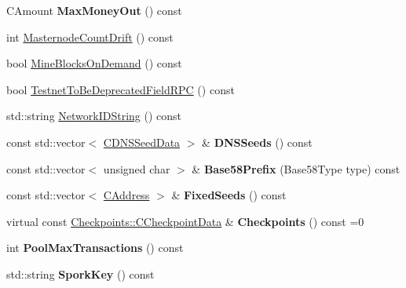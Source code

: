 \begin{DoxyCompactItemize}
C\+Amount {\bfseries Max\+Money\+Out} () const
\item 
int \mbox{\hyperlink{class_c_chain_params_a9d2e5ae617867ebcb930c65a146b6e5c}{Masternode\+Count\+Drift}} () const
\item 
bool \mbox{\hyperlink{class_c_chain_params_a96be31ff3d8525c9d5458b7d07ada6bb}{Mine\+Blocks\+On\+Demand}} () const
\item 
bool \mbox{\hyperlink{class_c_chain_params_a1552cea0636112ef84069cd6b7858b8e}{Testnet\+To\+Be\+Deprecated\+Field\+R\+PC}} () const
\item 
std\+::string \mbox{\hyperlink{class_c_chain_params_a2c02cc73f7fe9369cee9a39a0fd5b710}{Network\+I\+D\+String}} () const
\item 
\mbox{\label{class_c_chain_params_a402b8df138b265619217ddf934bbc67a}} 
const std\+::vector$<$ \mbox{\hyperlink{struct_c_d_n_s_seed_data}{C\+D\+N\+S\+Seed\+Data}} $>$ \& {\bfseries D\+N\+S\+Seeds} () const
\item 
\mbox{\label{class_c_chain_params_a103c58eca4a26a71201882b3ed6c4cb4}} 
const std\+::vector$<$ unsigned char $>$ \& {\bfseries Base58\+Prefix} (Base58\+Type type) const
\item 
\mbox{\label{class_c_chain_params_a3bd33f38910c2a7b435a71d270515b54}} 
const std\+::vector$<$ \mbox{\hyperlink{class_c_address}{C\+Address}} $>$ \& {\bfseries Fixed\+Seeds} () const
\item 
\mbox{\label{class_c_chain_params_aba314e7660492aee43812344fa796d6c}} 
virtual const \mbox{\hyperlink{struct_checkpoints_1_1_c_checkpoint_data}{Checkpoints\+::\+C\+Checkpoint\+Data}} \& {\bfseries Checkpoints} () const =0
\item 
\mbox{\label{class_c_chain_params_a128aaa94e4cfcba19dc26e6d2f5ad467}} 
int {\bfseries Pool\+Max\+Transactions} () const
\item 
\mbox{\label{class_c_chain_params_a8ad2fa7772a2d4fe430e6b933003a2c7}} 
std\+::string {\bfseries Spork\+Key} () const
\item 
\mbox{\label{class_c_chain_params_acf6464af63708a37e52876d2792eb27e}} 

\end{DoxyCompactItemize}
